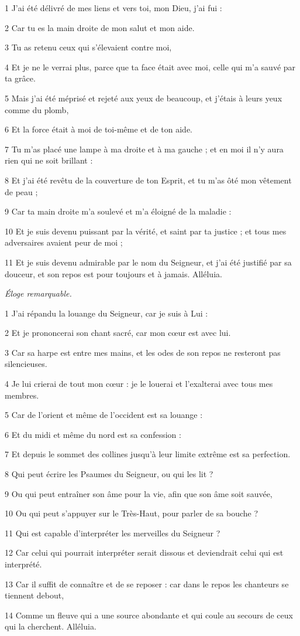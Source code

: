 \par 1 J'ai été délivré de mes liens et vers toi, mon Dieu, j'ai fui :
\par 2 Car tu es la main droite de mon salut et mon aide.
\par 3 Tu as retenu ceux qui s'élevaient contre moi,
\par 4 Et je ne le verrai plus, parce que ta face était avec moi, celle qui m'a sauvé par ta grâce.
\par 5 Mais j'ai été méprisé et rejeté aux yeux de beaucoup, et j'étais à leurs yeux comme du plomb,
\par 6 Et la force était à moi de toi-même et de ton aide.
\par 7 Tu m'as placé une lampe à ma droite et à ma gauche ; et en moi il n'y aura rien qui ne soit brillant :
\par 8 Et j'ai été revêtu de la couverture de ton Esprit, et tu m'as ôté mon vêtement de peau ;
\par 9 Car ta main droite m'a soulevé et m'a éloigné de la maladie :
\par 10 Et je suis devenu puissant par la vérité, et saint par ta justice ; et tous mes adversaires avaient peur de moi ;
\par 11 Et je suis devenu admirable par le nom du Seigneur, et j'ai été justifié par sa douceur, et son repos est pour toujours et à jamais. Alléluia.


\par \textit{Éloge remarquable.}

\par 1 J'ai répandu la louange du Seigneur, car je suis à Lui :
\par 2 Et je prononcerai son chant sacré, car mon cœur est avec lui.
\par 3 Car sa harpe est entre mes mains, et les odes de son repos ne resteront pas silencieuses.
\par 4 Je lui crierai de tout mon cœur : je le louerai et l'exalterai avec tous mes membres.
\par 5 Car de l'orient et même de l'occident est sa louange :
\par 6 Et du midi et même du nord est sa confession :
\par 7 Et depuis le sommet des collines jusqu'à leur limite extrême est sa perfection.
\par 8 Qui peut écrire les Psaumes du Seigneur, ou qui les lit ?
\par 9 Ou qui peut entraîner son âme pour la vie, afin que son âme soit sauvée,
\par 10 Ou qui peut s'appuyer sur le Très-Haut, pour parler de sa bouche ?
\par 11 Qui est capable d'interpréter les merveilles du Seigneur ?
\par 12 Car celui qui pourrait interpréter serait dissous et deviendrait celui qui est interprété.
\par 13 Car il suffit de connaître et de se reposer : car dans le repos les chanteurs se tiennent debout,
\par 14 Comme un fleuve qui a une source abondante et qui coule au secours de ceux qui la cherchent. Alléluia.

